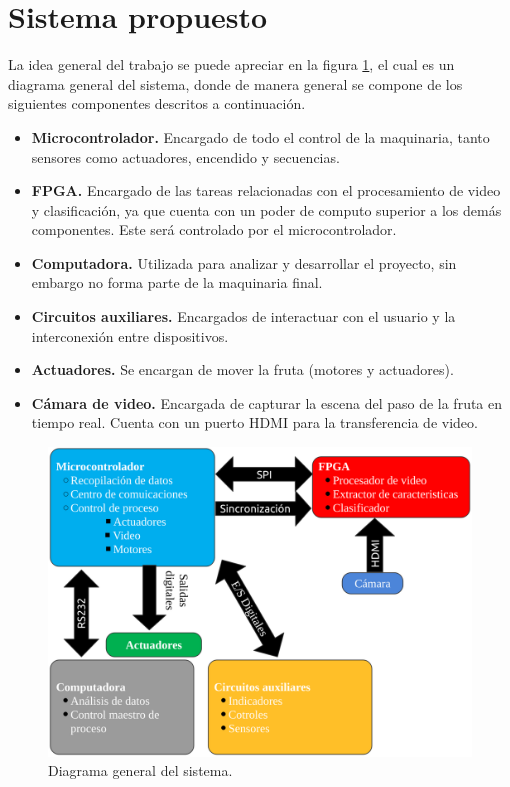 \documentclass[twoside,spanish,ESP,MSc]{plantillaLabUPV}
\theoremstyle{definition}
\begin{document}
\section{Sistema propuesto}
La idea general del trabajo se puede apreciar en la figura \ref{sis}, el cual es un diagrama general del sistema, donde de manera general se compone de los siguientes componentes descritos a continuación.

\begin{itemize}
	\item \textbf{Microcontrolador.} Encargado de todo el control de la maquinaria, tanto sensores como actuadores, encendido y secuencias. 
	\item \textbf{FPGA.} Encargado de las tareas relacionadas con el procesamiento de video y clasificación, ya que cuenta con un poder de computo superior a los demás componentes. Este será controlado por el microcontrolador.
	\item \textbf{Computadora.} Utilizada para analizar y desarrollar el proyecto, sin embargo no forma parte de la maquinaria final.
	\item \textbf{Circuitos auxiliares.} Encargados de interactuar con el usuario y la interconexión entre dispositivos.
	\item \textbf{Actuadores.} Se encargan de mover la fruta (motores y actuadores).
	\item \textbf{Cámara de video.} Encargada de capturar la escena del paso de la fruta en tiempo real. Cuenta con un puerto HDMI para la transferencia de video.
\end{itemize}


\begin{figure}[!tbh]
	\centering
	
	\includegraphics*[scale=0.4]{sis} 
	\caption{Diagrama general del sistema.}
	\label{sis}
\end{figure}
\end{document}
